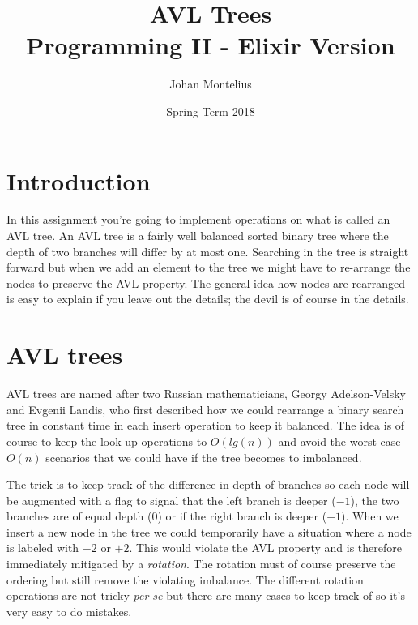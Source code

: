 \documentclass[a4paper,11pt]{article}
\begin{document}

\title{
    \textbf{AVL Trees}\\
    \large{Programming II - Elixir Version}
}
\author{Johan Montelius}
\date{Spring Term 2018}
\maketitle
\thispagestyle{fancy}



\section*{Introduction}

In this assignment you're going to implement operations on what is
called an AVL tree. An AVL tree is a fairly well balanced sorted
binary tree where the depth of two branches will differ by at most
one. Searching in the tree is straight forward but when we add an
element to the tree we might have to re-arrange the nodes to preserve
the AVL property. The general idea how nodes are rearranged is easy to
explain if you leave out the details; the devil is of course in the
details.



\section{AVL trees}

AVL trees are named after two Russian mathematicians, Georgy
Adelson-Velsky and Evgenii Landis, who first described how we could
rearrange a binary search tree in constant time in each insert
operation to keep it balanced. The idea is of course to keep the
look-up operations to $O(lg(n))$ and avoid the worst case $O(n)$
scenarios that we could have if the tree becomes to imbalanced.

The trick is to keep track of the difference in depth of branches so
each node will be augmented with a flag to signal that the left branch
is deeper ($-1$), the two branches are of equal depth ($0$) or if the
right branch is deeper ($+1$). When we insert a new node in the tree we
could temporarily have a situation where a node is labeled with $-2$ or
$+2$. This would violate the AVL property and is therefore immediately
mitigated by a {\em rotation}. The rotation must of course preserve
the ordering but still remove the violating imbalance. The different
rotation operations are not tricky {\em per se} but there are many
cases to keep track of so it's very easy to do mistakes. 
\end{document}
